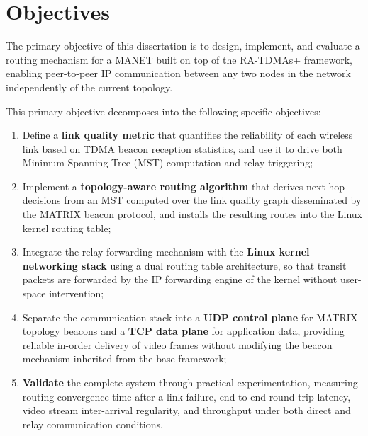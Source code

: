 \section{Objectives}
\label{sec:objectives}

The primary objective of this dissertation is to design, implement, and
evaluate a routing mechanism for a MANET built on top of the RA-TDMAs+
framework, enabling peer-to-peer IP communication between any two nodes in
the network independently of the current topology.

This primary objective decomposes into the following specific objectives:

\begin{enumerate}

    \item Define a \textbf{link quality metric} that quantifies the reliability
    of each wireless link based on TDMA beacon reception statistics, and use it
    to drive both Minimum Spanning Tree (MST) computation and relay triggering;

    \item Implement a \textbf{topology-aware routing algorithm} that derives
    next-hop decisions from an MST computed over the link quality graph
    disseminated by the MATRIX beacon protocol, and installs the resulting
    routes into the Linux kernel routing table;

    \item Integrate the relay forwarding mechanism with the \textbf{Linux
    kernel networking stack} using a dual routing table architecture, so that
    transit packets are forwarded by the IP forwarding engine of the kernel
    without user-space intervention;

    \item Separate the communication stack into a \textbf{UDP control plane}
    for MATRIX topology beacons and a \textbf{TCP data plane} for application
    data, providing reliable in-order delivery of video frames without modifying
    the beacon mechanism inherited from the base framework;

    \item \textbf{Validate} the complete system through practical
    experimentation, measuring routing convergence time after a link failure,
    end-to-end round-trip latency, video stream inter-arrival regularity, and
    throughput under both direct and relay communication conditions.

\end{enumerate}

